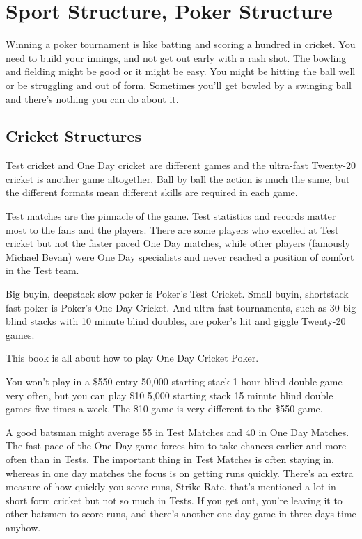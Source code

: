 \chapter{Sport Structure, Poker Structure}


Winning a poker tournament is like batting and scoring a hundred in cricket.
You need to build your innings, and not get out early
with a rash shot. The bowling and fielding might be good or it might
be easy. You might be hitting the ball well or be struggling and out
of form. Sometimes you'll get bowled by a swinging ball and
there's nothing you can do about it.

\section{Cricket Structures}

Test cricket and One Day cricket are different games and the ultra-fast
Twenty-20 cricket is another game altogether. Ball by ball the
action is much the same, but the different formats mean
different skills are required in each game.

Test matches are the pinnacle of the game. Test statistics and records
matter most to the fans and the players. There are some players who excelled
at Test cricket but not the faster paced One Day matches, while
other players (famously Michael Bevan) were One Day
specialists and never reached a position of comfort in the Test team.

Big buyin, deepstack slow poker is Poker's Test Cricket.
Small buyin, shortstack fast poker is Poker's One Day Cricket.
And ultra-fast tournaments, such as 30 big blind stacks with 10 minute
blind doubles, are poker's hit and giggle Twenty-20 games.

This book is all about how to play One Day Cricket Poker.

You won't play in a \$550 entry 50,000 starting stack 1 hour blind double
game very often, but you can play \$10 5,000 starting stack 15 minute
blind double games five times a week. The \$10 game is very
different to the \$550 game.

A good batsman might average 55 in Test Matches and 40 in One Day
Matches. The fast pace of the One Day game forces him to take
chances earlier and more often than in Tests. The important thing in
Test Matches is often staying in, whereas in one day matches
the focus is on getting runs quickly. There's an extra
measure of how quickly you score runs, Strike Rate, that's mentioned
a lot in short form cricket but not so much in Tests. If you get out,
you're leaving it to other batsmen to score runs, and there's another
one day game in three days time anyhow.

